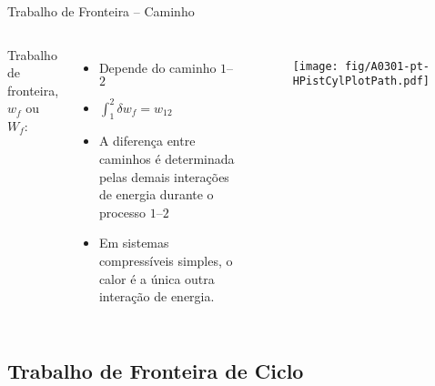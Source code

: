     \begin{frame}{Trabalho de Fronteira -- Caminho}\vspace*{-2em}
        \begin{columns}
        Trabalho de fronteira, $w_f$ ou $W_f$:
        \begin{itemize}
            \item<1-> Depende do \alert{caminho $1$--$2$} \\[\medskipamount]
            \item<2-> $\int_1^2\delta w_f = w_{12}\;$ \\[\medskipamount]
            \item<4-> A \alert{diferença} entre caminhos é determinada pelas demais interações
                de energia durante o processo $1$--$2$ \\[\medskipamount]
            \item<5-> Em \alert{sistemas compressíveis simples}, o \alert{calor} é a única outra
                interação de energia.
        \end{itemize}
            \begin{figure}
                \texttt{[image: fig/A0301-pt-HPistCylPlotPath.pdf]}
            \end{figure}
        \end{columns}
    \end{frame}

\subsection{Trabalho de Fronteira de Ciclo}

